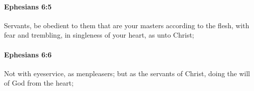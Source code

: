 		\paragraph{Ephesians 6:5} %
			\label{EPHESIANS-6-5}

			Servants, be obedient to them that are your masters according to the flesh, with fear and trembling, in singleness of your heart, as unto Christ;

			\begin{framed}
			\scriptsize
				\begin{compactdesc}
					\item[SBLG] 
				\end{compactdesc}
			\end{framed}

		\paragraph{Ephesians 6:6} %
			\label{EPHESIANS-6-6}

			Not with eyeservice, as menpleasers; but as the servants of Christ, doing the will of God from the heart;

